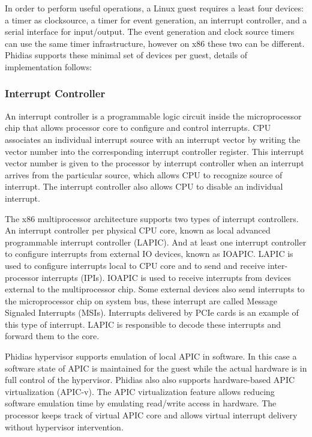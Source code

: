 In order to perform useful operations, a Linux guest requires a least four devices: a timer as clocksource, a timer for event generation, an interrupt controller, and a serial interface for input/output. The event generation and clock source timers can use the same timer infrastructure, however on x86 these two can be different. Phidias supports these minimal set of devices per guest, details of implementation follows:

\subsubsection{Interrupt Controller}
An interrupt controller is a programmable logic circuit inside the microprocessor chip that allows processor core to configure and control interrupts.
CPU associates an individual interrupt source with an interrupt vector by writing the vector number into the corresponding interrupt controller register.
This interrupt vector number is given to the processor by interrupt controller when an interrupt arrives from the particular source, which allows CPU to
recognize source of interrupt. The interrupt controller also allows CPU to disable an individual interrupt.

The x86 multiprocessor architecture supports two types of interrupt controllers.
An interrupt controller per physical CPU core, known as local advanced programmable interrupt controller (LAPIC).
And at least one interrupt controller to configure interrupts from external IO devices, known as IOAPIC.
LAPIC is used to configure interrupts local to CPU core and to send and receive inter-processor interrupts (IPIs).
IOAPIC is used to receive interrupts from devices external to the multiprocessor chip.
Some external devices also send interrupts to the microprocessor chip on system bus, these interrupt are called Message Signaled Interrupts (MSIs).
Interrupts delivered by PCIe cards is an example of this type of interrupt.
LAPIC is responsible to decode these interrupts and forward them to the core.

Phidias hypervisor supports emulation of local APIC in software. 
In this case a software state of APIC is maintained for the guest while the actual hardware is in full control of the hypervisor.
Phidias also also supports hardware-based APIC virtualization (APIC-v).
The APIC virtualization feature allows reducing software emulation time by emulating read/write access in hardware.
The processor keeps track of virtual APIC core and allows virtual interrupt delivery without hypervisor intervention.

